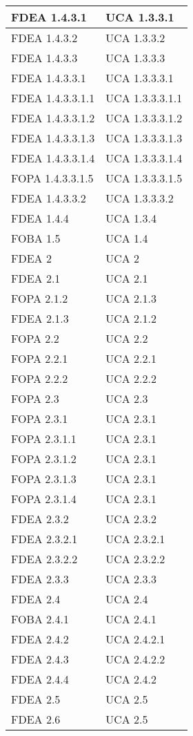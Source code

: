 \begin{longtable}{XX}
\midrule
FDEA 1.4.3.1&UCA 1.3.3.1\\
\midrule
FDEA 1.4.3.2&UCA 1.3.3.2\\
\midrule
FDEA 1.4.3.3&UCA 1.3.3.3\\
\midrule
FDEA 1.4.3.3.1&UCA 1.3.3.3.1\\
\midrule
FDEA 1.4.3.3.1.1&UCA 1.3.3.3.1.1\\
\midrule
FDEA 1.4.3.3.1.2&UCA 1.3.3.3.1.2\\
\midrule
FDEA 1.4.3.3.1.3&UCA 1.3.3.3.1.3\\
\midrule
FDEA 1.4.3.3.1.4&UCA 1.3.3.3.1.4\\
\midrule
FOPA 1.4.3.3.1.5&UCA 1.3.3.3.1.5\\
\midrule
FDEA 1.4.3.3.2&UCA 1.3.3.3.2\\
\midrule
FDEA 1.4.4&UCA 1.3.4\\
\midrule
FOBA 1.5&UCA 1.4\\
\midrule
FDEA 2&UCA 2\\
\midrule
FDEA 2.1&UCA 2.1\\
\midrule
FOPA 2.1.2&UCA 2.1.3\\
\midrule
FDEA 2.1.3&UCA 2.1.2\\
\midrule
FOPA 2.2&UCA 2.2\\
\midrule
FOPA 2.2.1&UCA 2.2.1\\
\midrule
FOPA 2.2.2&UCA 2.2.2\\
\midrule
FOPA 2.3&UCA 2.3\\
\midrule
FOPA 2.3.1&UCA 2.3.1\\
\midrule
FOPA 2.3.1.1&UCA 2.3.1\\
\midrule
FOPA 2.3.1.2&UCA 2.3.1\\
\midrule
FOPA 2.3.1.3&UCA 2.3.1\\
\midrule
FOPA 2.3.1.4&UCA 2.3.1\\
\midrule
FDEA 2.3.2&UCA 2.3.2\\
\midrule
FDEA 2.3.2.1&UCA 2.3.2.1\\
\midrule
FDEA 2.3.2.2&UCA 2.3.2.2\\
\midrule
FDEA 2.3.3&UCA 2.3.3\\
\midrule
FDEA 2.4&UCA 2.4\\
\midrule
FOBA 2.4.1&UCA 2.4.1\\
\midrule
FDEA 2.4.2&UCA 2.4.2.1\\
\midrule
FDEA 2.4.3&UCA 2.4.2.2\\
\midrule
FDEA 2.4.4&UCA 2.4.2\\
\midrule
FDEA 2.5&UCA 2.5\\
\midrule
FDEA 2.6&UCA 2.5\\
\midrule


\end{longtable}
